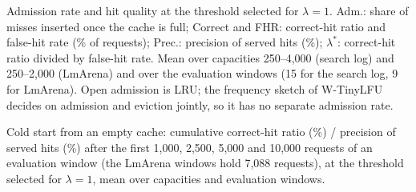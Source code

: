 \begin{table}[htbp]
\centering
\caption{Admission rate and hit quality at the threshold selected for $\lambda=1$. Adm.: share of misses inserted once the cache is full; Correct and FHR: correct-hit ratio and false-hit rate (\% of requests); Prec.: precision of served hits (\%); $\lambda^{*}$: correct-hit ratio divided by false-hit rate. Mean over capacities 250--4,000 (search log) and 250--2,000 (LmArena) and over the evaluation windows (15 for the search log, 9 for LmArena). Open admission is LRU; the frequency sketch of W-TinyLFU decides on admission and eviction jointly, so it has no separate admission rate.}
\label{tab:admission_matched}
\resizebox{\textwidth}{!}{%
}
\end{table}

\begin{table}[htbp]
\centering
\caption{Cold start from an empty cache: cumulative correct-hit ratio (\%) / precision of served hits (\%) after the first 1,000, 2,500, 5,000 and 10,000 requests of an evaluation window (the LmArena windows hold 7,088 requests), at the threshold selected for $\lambda=1$, mean over capacities and evaluation windows.}
\label{tab:cold_start}
\resizebox{\textwidth}{!}{%
}
\end{table}

